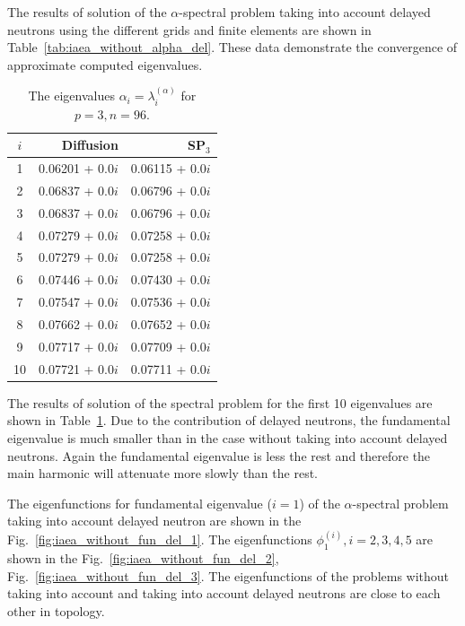 \documentclass[authoryear]{elsarticle}
\begin{document}
The results of solution of the $\alpha$-spectral problem taking into account delayed neutrons using the different grids and finite elements are shown in Table~\ref{tab:iaea_without_alpha_del}.
These data demonstrate the convergence of approximate computed eigenvalues.

\begin{table}[h]
\caption{The eigenvalues $\alpha_i=\lambda_i^{(\alpha)}$ for $p=3, n=96$.}
\label{tab:iaea_without_alpha_del_10}
\begin{center}
\begin{tabular}{c r r}
\hline
$i$ & Diffusion & SP$_3$ \\
\hline
1& 0.06201 + 0.0$i$&0.06115 + 0.0$i$\\
2& 0.06837 + 0.0$i$&0.06796 + 0.0$i$\\
3& 0.06837 + 0.0$i$&0.06796 + 0.0$i$\\
4& 0.07279 + 0.0$i$&0.07258 + 0.0$i$\\
5& 0.07279 + 0.0$i$&0.07258 + 0.0$i$\\
6& 0.07446 + 0.0$i$&0.07430 + 0.0$i$\\
7& 0.07547 + 0.0$i$&0.07536 + 0.0$i$\\
8& 0.07662 + 0.0$i$&0.07652 + 0.0$i$\\
9& 0.07717 + 0.0$i$&0.07709 + 0.0$i$\\
10& 0.07721 + 0.0$i$&0.07711 + 0.0$i$\\
\hline
\end{tabular}
\end{center}
\end{table}

The results of solution of the spectral problem for the first 10 eigenvalues are shown in Table~\ref{tab:iaea_without_alpha_del_10}.
Due to the contribution of delayed neutrons, the fundamental eigenvalue is much smaller than in the case without taking into account delayed neutrons.
Again the fundamental eigenvalue is less the rest and therefore the main harmonic  will attenuate more slowly than the rest.

The eigenfunctions for fundamental eigenvalue ($i=1$) of the $\alpha$-spectral problem taking into account delayed neutron are shown in the Fig.~\ref{fig:iaea_without_fun_del_1}. 
The eigenfunctions $\phi_1^{(i)}, i=2,3,4,5$ are shown in the Fig.~\ref{fig:iaea_without_fun_del_2}, Fig.~\ref{fig:iaea_without_fun_del_3}.
The eigenfunctions of the problems without taking into account and taking into account delayed neutrons are close to each other in topology.
\end{document}
